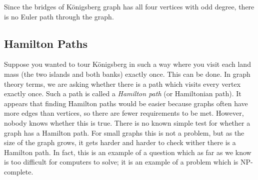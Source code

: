 \documentclass[12pt]{article}
\begin{document}
Since the bridges of K\"onigsberg graph has all four vertices with odd degree, there is no Euler path through the graph.

\subsection{Hamilton Paths}

Suppose you wanted to tour K\"onigsberg in such a way where you visit each land mass (the two islands and both banks) exactly once.  This can be done.  In graph theory terms, we are asking whether there is a path which visits every vertex exactly once.  Such a path is called a {\em Hamilton path} (or Hamiltonian path).  It appears that finding Hamilton paths would be easier because graphs often have more edges than vertices, so there are fewer requirements to be met.  However, nobody knows whether this is true.  There is no known simple test for whether a graph has a Hamilton path.  For small graphs this is not a problem, but as the size of the graph grows, it gets harder and harder to check wither there is a Hamilton path.  In fact, this is an example of a question which as far as we know is too difficult for computers to solve; it is an example of a problem which is NP-complete.
\end{document}
